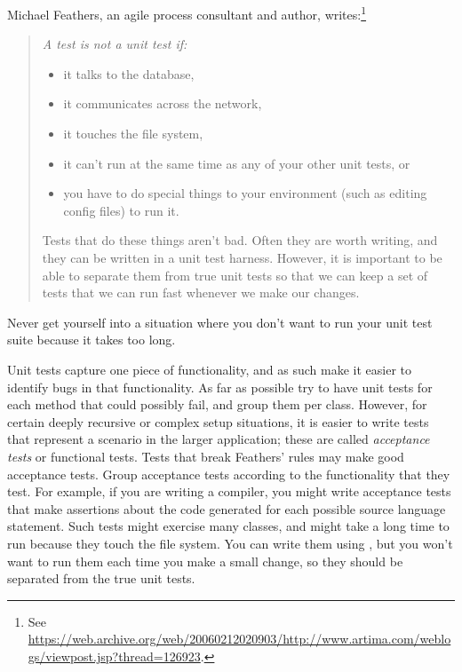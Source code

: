 \documentclass[a4paper,10pt,twoside]{book}
\begin{document}
{\begin{description}
\item[Feathers' Rules for Unit tests.]
	Michael Feathers, an  agile process consultant and author, writes:\footnote{See \url{https://web.archive.org/web/20060212020903/http://www.artima.com/weblogs/viewpost.jsp?thread=126923}.}
	\begin{quotation}
	\noindent
	{\it
	A test is not a unit test if:
	\begin{itemize}
		\item it talks to the database,
		\item it communicates across the network,
		\item it touches the file system,
		\item it can't run at the same time as any of your other unit tests, or
		\item you have to do special things to your environment (such as editing config files) to run it.
	\end{itemize}
	Tests that do these things aren't bad.
	Often they are worth writing, and they can be written in a unit test harness.
	However, it is important to be able to separate them from true unit tests so that we can keep a set of tests that we can run fast whenever we make our changes.
 	}
	\end{quotation}
	Never get yourself into a situation where you don't want to run your unit test suite because it takes too long.

\item[Unit Tests \textit{vs.}\ Acceptance Tests.]
	Unit tests capture one piece of functionality, and as such make it easier to identify bugs in that functionality.
	As far as possible try to have unit tests for each method that could possibly fail, and group them per class.
	However, for certain deeply recursive or complex setup situations, it is easier to write tests that represent a scenario in the larger application; these are called \emph{acceptance tests} or functional tests.
	Tests that break Feathers' rules may make good acceptance tests.
	Group acceptance tests according to the functionality that they test.
	For example, if you are writing a compiler, you might write acceptance tests that make  assertions about the code generated for each possible source language statement.
	Such tests might exercise many classes, and might take a long time to run because they touch the file system.
	You can write them using \sunit, but you won't want to run them each time you make a small change, so they should be separated from the true unit tests.


\end{description}}
\end{document}
